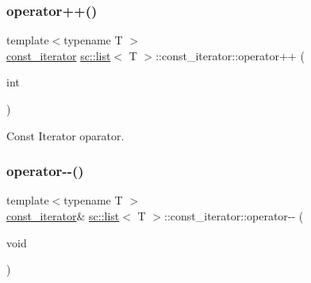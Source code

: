 \mbox{\label{classsc_1_1list_1_1const__iterator_a7f659a312caded356c8d7eb99437e524}} 
\subsubsection{\texorpdfstring{operator++()}{operator++()}\hspace{0.1cm}{\footnotesize\ttfamily [2/2]}}
{\footnotesize\ttfamily template$<$typename T $>$ \\
\hyperlink{classsc_1_1list_1_1const__iterator}{const\+\_\+iterator} \hyperlink{classsc_1_1list}{sc\+::list}$<$ T $>$\+::const\+\_\+iterator\+::operator++ (\begin{DoxyParamCaption}\item[{int}]{ }\end{DoxyParamCaption})\hspace{0.3cm}{\ttfamily [inline]}}



Const Iterator oparator. 

\mbox{\label{classsc_1_1list_1_1const__iterator_a480a4fea0a46d2a4665b524eabd53fd9}} 
\subsubsection{\texorpdfstring{operator-\/-\/()}{operator--()}\hspace{0.1cm}{\footnotesize\ttfamily [1/2]}}
{\footnotesize\ttfamily template$<$typename T $>$ \\
\hyperlink{classsc_1_1list_1_1const__iterator}{const\+\_\+iterator}\& \hyperlink{classsc_1_1list}{sc\+::list}$<$ T $>$\+::const\+\_\+iterator\+::operator-\/-\/ (\begin{DoxyParamCaption}\item[{void}]{ }\end{DoxyParamCaption})\hspace{0.3cm}{\ttfamily [inline]}}



